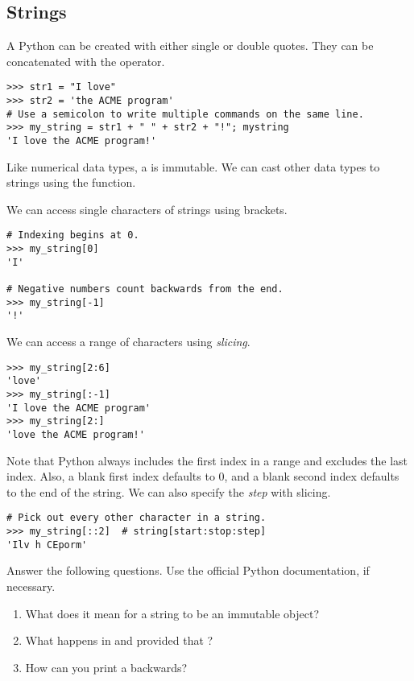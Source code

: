 \subsection*{Strings}
\begin{example} A Python  can be created with either single or double quotes. They can be concatenated with the \li{+} operator.
\begin{lstlisting}
>>> str1 = "I love"
>>> str2 = 'the ACME program'
# Use a semicolon to write multiple commands on the same line.
>>> my_string = str1 + " " + str2 + "!"; mystring
'I love the ACME program!'
\end{lstlisting}

Like numerical data types, a  is immutable. We can cast other data types to strings using the  function.

We can access single characters of strings using brackets.

\begin{lstlisting}
# Indexing begins at 0.
>>> my_string[0]
'I'

# Negative numbers count backwards from the end.
>>> my_string[-1]
'!'
\end{lstlisting}

We can access a range of characters using \emph{slicing}.
\begin{lstlisting}
>>> my_string[2:6]
'love'
>>> my_string[:-1]
'I love the ACME program'
>>> my_string[2:]
'love the ACME program!'
\end{lstlisting}
Note that Python always includes the first index in a range and excludes the last index. Also, a blank first index defaults to 0, and a blank second index defaults to the end of the string. We can also specify the \emph{step} with slicing.
\begin{lstlisting}
# Pick out every other character in a string.
>>> my_string[::2]	# string[start:stop:step]
'Ilv h CEporm'
\end{lstlisting}
\end{example}

\begin{problem}
Answer the following questions. Use the official Python documentation, if necessary.
\begin{enumerate}
\item What does it mean for a string to be an immutable object? 
\item What happens in  and  provided 
that ? 
\item How can you print a  backwards?
\end{enumerate}
\end{problem}

